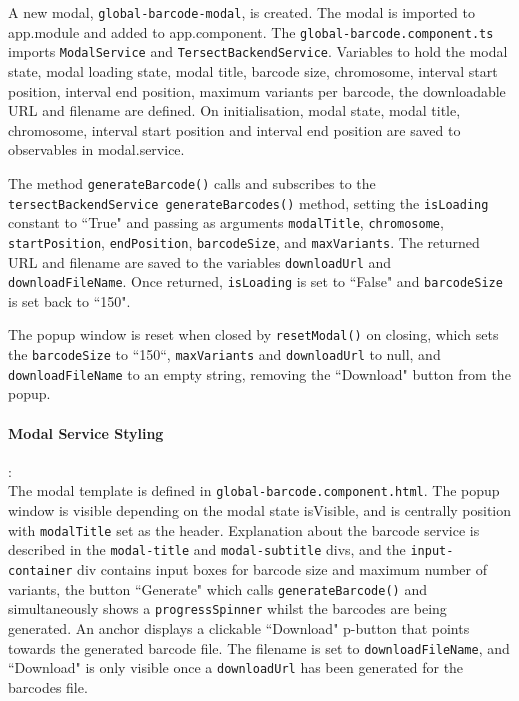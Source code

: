 \documentclass[12pt]{article}
\begin{document}
A new modal, \verb+global-barcode-modal+, is created. The modal is imported to app.module and added to app.component. The \verb+global-barcode.component.ts+ imports \verb+ModalService+ and \verb+TersectBackendService+. Variables to hold the modal state, modal loading state, modal title, barcode size, chromosome, interval start position, interval end position, maximum variants per barcode, the downloadable URL and filename are defined. On initialisation, modal state, modal title, chromosome, interval start position and interval end position are saved to observables in modal.service. 

The method \verb+generateBarcode()+ calls and subscribes to the \verb+tersectBackendService generateBarcodes()+ method, setting the \verb+isLoading+ constant to ``True" and passing as arguments \verb+modalTitle+, \verb+chromosome+, \verb+startPosition+, \verb+endPosition+, \verb+barcodeSize+, and \verb+maxVariants+. The returned URL and filename are saved to the variables \verb+downloadUrl+ and \verb+downloadFileName+. Once returned, \verb+isLoading+ is set to ``False" and \verb+barcodeSize+ is set back to ``150". 

The popup window is reset when closed by \verb+resetModal()+ on closing, which sets the \verb+barcodeSize+ to ``150``, \verb+maxVariants+ and \verb+downloadUrl+ to null, and \verb+downloadFileName+ to an empty string, removing the ``Download" button from the popup.  

\paragraph{Modal Service Styling}:\\
The modal template is defined in \verb+global-barcode.component.html+. The popup window is visible depending on the modal state isVisible, and is centrally position with \verb+modalTitle+ set as the header. Explanation about the barcode service is described in the \verb+modal-title+ and \verb+modal-subtitle+ divs, and the \verb+input-container+ div contains input boxes for barcode size and maximum number of variants, the button ``Generate" which calls \verb+generateBarcode()+ and simultaneously shows a \verb+progressSpinner+ whilst the barcodes are being generated. An anchor displays a clickable ``Download" p-button that points towards the generated barcode file. The filename is set to \verb+downloadFileName+, and ``Download" is only visible once a \verb+downloadUrl+ has been generated for the barcodes file.  
\end{document}
